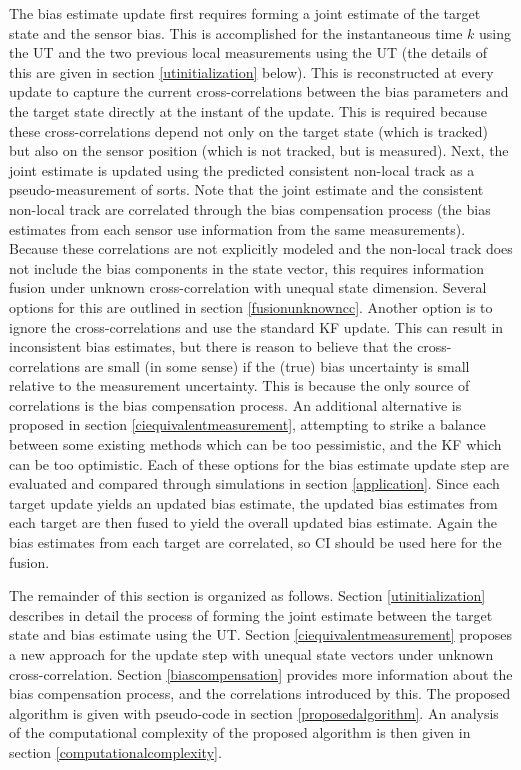 \documentclass[journal]{IEEEtran}
\begin{document}
The bias estimate update first requires forming a joint estimate of the target state and the sensor bias. This is accomplished for the instantaneous time $k$ using the UT and the two previous local measurements using the UT (the details of this are given in section \ref{utinitialization} below). This is reconstructed at every update to capture the current cross-correlations between the bias parameters and the target state directly at the instant of the update. This is required because these cross-correlations depend not only on the target state (which is tracked) but also on the sensor position (which is not tracked, but is measured). Next, the joint estimate is updated using the predicted consistent non-local track as a pseudo-measurement of sorts. Note that the joint estimate and the consistent non-local track are correlated through the bias compensation process (the bias estimates from each sensor use information from the same measurements). Because these correlations are not explicitly modeled and the non-local track does not include the bias components in the state vector, this requires information fusion under unknown cross-correlation with unequal state dimension. Several options for this are outlined in section \ref{fusionunknowncc}. Another option is to ignore the cross-correlations and use the standard KF update. This can result in inconsistent bias estimates, but there is reason to believe that the cross-correlations are small (in some sense) if the (true) bias uncertainty is small relative to the measurement uncertainty. This is because the only source of correlations is the bias compensation process. An additional alternative is proposed in section \ref{ciequivalentmeasurement}, attempting to strike a balance between some existing methods which can be too pessimistic, and the KF which can be too optimistic. Each of these options for the bias estimate update step are evaluated and compared through simulations in section \ref{application}. Since each target update yields an updated bias estimate, the updated bias estimates from each target are then fused to yield the overall updated bias estimate. Again the bias estimates from each target are correlated, so CI should be used here for the fusion.

The remainder of this section is organized as follows. Section \ref{utinitialization} describes in detail the process of forming the joint estimate between the target state and bias estimate using the UT. Section \ref{ciequivalentmeasurement} proposes a new approach for the update step with unequal state vectors under unknown cross-correlation. Section \ref{biascompensation} provides more information about the bias compensation process, and the correlations introduced by this. The proposed algorithm is given with pseudo-code in section \ref{proposedalgorithm}. An analysis of the computational complexity of the proposed algorithm is then given in section \ref{computationalcomplexity}.
\end{document}
